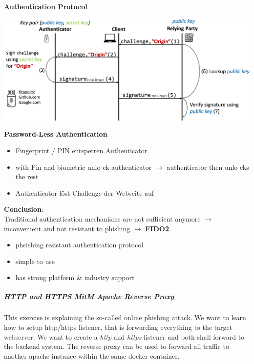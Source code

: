 \textbf{Authentication Protocol}\\
\begin{center}
    \vspace{-8pt}
    \includegraphics[width=1.0\linewidth]{./img/09-mitm/fido2_proto}
    \vspace{-8pt}
\end{center}

\textbf{Password-Less Authentication}
\begin{itemize}
    \item Fingerprint / PIN entsperren Authenticator
    \item with Pin and biometric unlo ck authenticator $\rightarrow$ authenticator then unlo cks the rest
    \item Authenticator löst Challenge der Webseite auf\\
\end{itemize}

\textbf{Conclusion}:\\
Traditional authentication mechanisms are not sufficient anymore $\rightarrow$ inconvenient and not resistant to phishing $\rightarrow$ \textbf{FIDO2}
\begin{itemize}
    \item phsishing resistant authentication protocol
    \item simple to use
    \item has strong platform \& industry support
\end{itemize}

\subparagraph{HTTP and HTTPS MitM Apache Reverse Proxy}

This exercise is explaining the so-called online phishing attack. We want to learn how to setup http/https listener, that is forwarding everything to the target webserver. We want to create a \textit{http} and \textit{https} listener and both shall forward to the backend system. The reverse proxy can be used to forward all traffic to another apache instance within the same docker container.

